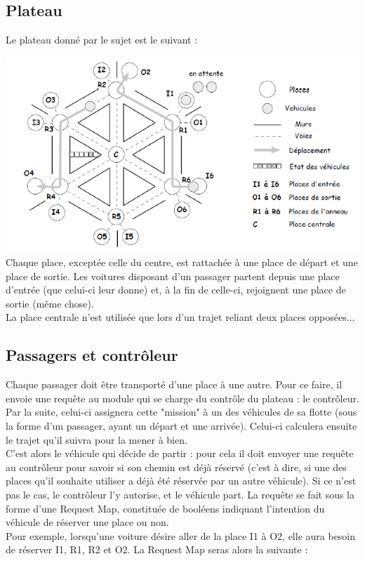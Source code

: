 \documentclass[a4paper, titlepage]{report}
\begin{document}
\subsection{Plateau}
Le plateau donné par le sujet est le suivant :
\vspace{0.5cm}

\includegraphics[frame]{Images/Plateau}
\vspace{0.5cm}
\\
Chaque place, exceptée celle du centre, est rattachée à une place de départ et une place de sortie. Les voitures disposant d'un passager partent depuis une place d'entrée (que celui-ci leur donne) et, à la fin de celle-ci, rejoignent une place de sortie (même chose).\\
La place centrale n'est utilisée que lors d'un trajet reliant deux places opposées...
\subsection{Passagers et contrôleur}
Chaque passager doit être transporté d'une place à une autre. Pour ce faire, il envoie une requête au module qui se charge du contrôle du plateau : le contrôleur. Par la suite, celui-ci assignera cette "mission" à un des véhicules de sa flotte (sous la forme d'un passager, ayant un départ et une arrivée). Celui-ci calculera ensuite le trajet qu'il suivra pour la mener à bien.\\
C'est alors le véhicule qui décide de partir : pour cela il doit envoyer une requête au contrôleur pour savoir si son chemin est déjà réservé (c'est à dire, si une des places qu'il souhaite utiliser a déjà été réservée par un autre véhicule). Si ce n'est pas le cas, le contrôleur l'y autorise, et le véhicule part. La requête se fait sous la forme d'une Request Map, constituée de booléens indiquant l'intention du véhicule de réserver une place ou non.\\
Pour exemple, lorsqu'une voiture désire aller de la place I1 à O2, elle aura besoin de réserver I1, R1, R2 et O2. La Request Map seras alors la suivante :
\vspace{0.5cm}
\end{document}
